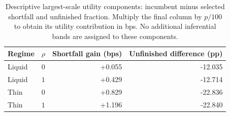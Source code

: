 \begin{table}[t]\centering\small
\begin{tabular}{llrr}\toprule
Regime & $\rho$ & Shortfall gain (bps) & Unfinished difference (pp) \\
\midrule
Liquid & $0$ & +0.055 & -12.035 \\
Liquid & $1$ & +0.429 & -12.714 \\
Thin & $0$ & +0.829 & -22.836 \\
Thin & $1$ & +1.196 & -22.840 \\
\bottomrule\end{tabular}
\caption{Descriptive largest-scale utility components: incumbent minus selected shortfall and unfinished fraction. Multiply the final column by $p/100$ to obtain its utility contribution in bps. No additional inferential bands are assigned to these components.}\label{tab:components}
\end{table}
